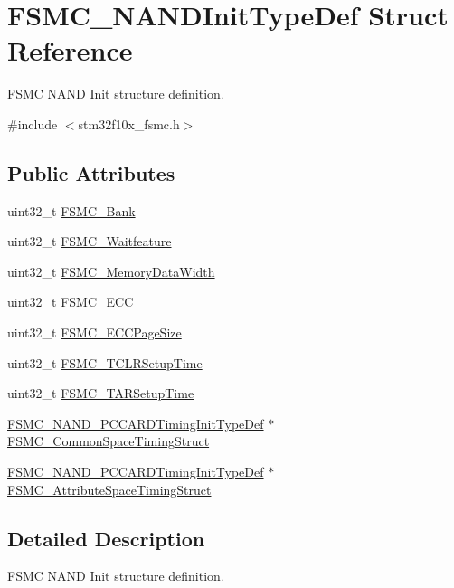 \hypertarget{structFSMC__NANDInitTypeDef}{
\section{FSMC\_\-NANDInitTypeDef Struct Reference}
\label{structFSMC__NANDInitTypeDef}
}


FSMC NAND Init structure definition.  




{\ttfamily \#include $<$stm32f10x\_\-fsmc.h$>$}

\subsection*{Public Attributes}
\begin{DoxyCompactItemize}
\item 
uint32\_\-t \hyperlink{structFSMC__NANDInitTypeDef_a60d3ead2188e1dbdf06810e952b3ce0f}{FSMC\_\-Bank}
\item 
uint32\_\-t \hyperlink{structFSMC__NANDInitTypeDef_ab350e15014c4a9f4b2c2f2848f11eeca}{FSMC\_\-Waitfeature}
\item 
uint32\_\-t \hyperlink{structFSMC__NANDInitTypeDef_ab4a4f56aab3150d8fb02aaf092db0235}{FSMC\_\-MemoryDataWidth}
\item 
uint32\_\-t \hyperlink{structFSMC__NANDInitTypeDef_a58d0510c0ce0ae3d1e3863bf8f571377}{FSMC\_\-ECC}
\item 
uint32\_\-t \hyperlink{structFSMC__NANDInitTypeDef_a7ed6a25710ba724a7a8f90af60130cf6}{FSMC\_\-ECCPageSize}
\item 
uint32\_\-t \hyperlink{structFSMC__NANDInitTypeDef_a633c7be46a1d281916b9f2e34fa3d36a}{FSMC\_\-TCLRSetupTime}
\item 
uint32\_\-t \hyperlink{structFSMC__NANDInitTypeDef_a014c1b8977b454ac15654d93dbb7dff9}{FSMC\_\-TARSetupTime}
\item 
\hyperlink{structFSMC__NAND__PCCARDTimingInitTypeDef}{FSMC\_\-NAND\_\-PCCARDTimingInitTypeDef} $\ast$ \hyperlink{structFSMC__NANDInitTypeDef_a7ab117a15e780c02fcad5d844e71c425}{FSMC\_\-CommonSpaceTimingStruct}
\item 
\hyperlink{structFSMC__NAND__PCCARDTimingInitTypeDef}{FSMC\_\-NAND\_\-PCCARDTimingInitTypeDef} $\ast$ \hyperlink{structFSMC__NANDInitTypeDef_a2a33bd855240dba37e507f223dbca062}{FSMC\_\-AttributeSpaceTimingStruct}
\end{DoxyCompactItemize}


\subsection{Detailed Description}
FSMC NAND Init structure definition. 

